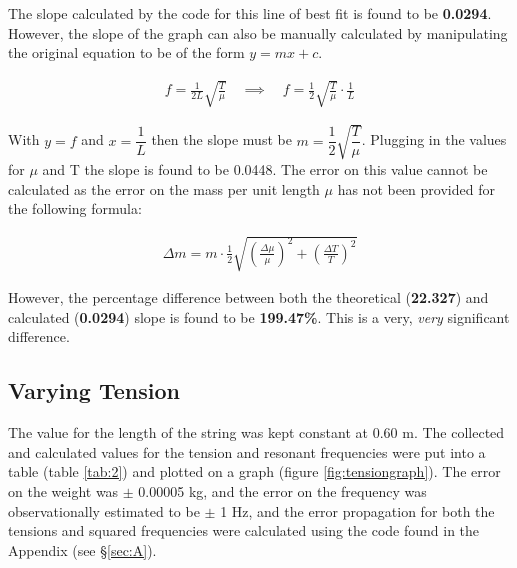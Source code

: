 \documentclass[12pt]{article}
\begin{document}
The slope calculated by the code for this line of best fit is found to be \textbf{0.0294}.
However, the slope of the graph can also be manually calculated by manipulating the original equation to be of the form $y=mx+c$.

\vspace{-1.5ex}
\begin{gather*}
    f = \frac{1}{2L} \sqrt{\frac{T}{\mu}} \quad \implies \quad f = \frac{1}{2} \sqrt{\frac{T}{\mu}} \cdot \frac{1}{L}
\end{gather*}

With $y = f$ and $x = \dfrac{1}{L}$ then the slope must be $m = \dfrac{1}{2} \sqrt{\dfrac{T}{\mu}}$. Plugging in the values for $\mu$ and T the slope is found to be 0.0448. The error on this value cannot be calculated
as the error on the mass per unit length $\mu$ has not been provided for the following formula:

\vspace{-1.5ex}
\begin{gather*}
    \Delta m = m \cdot \frac{1}{2} \sqrt{\left( \frac{\Delta \mu}{\mu} \right)^2 + \left( \frac{\Delta T}{T} \right)^2}
\end{gather*}

However, the percentage difference between both the theoretical (\textbf{22.327}) and calculated (\textbf{0.0294}) slope is found to be \textbf{199.47\%}. This is a very, \textit{very} significant difference.

\subsection{Varying Tension} \label{sec:3.3}

The value for the length of the string was kept constant at 0.60 m. The collected and calculated values for the tension and resonant frequencies were put into a table (table \ref{tab:2}) and plotted on a graph (figure \ref{fig:tensiongraph}).
The error on the weight was $\pm$ 0.00005 kg, and the error on the frequency was observationally estimated to be $\pm$ 1 Hz, and the error propagation for both the tensions and squared frequencies were calculated using the code found in the Appendix (see §\ref{sec:A}).
\end{document}

